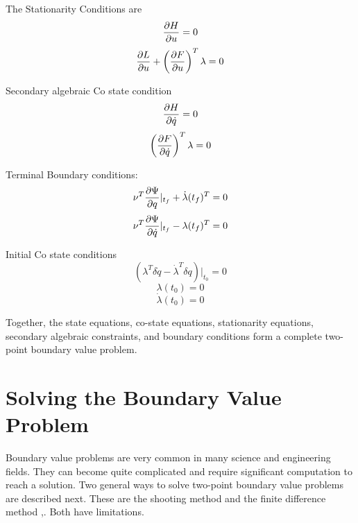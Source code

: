 The Stationarity Conditions are
\begin{equation}
    \frac{\partial H}{\partial u} = 0
\end{equation}
\begin{equation}
    \frac{\partial L}{\partial u} + \left( \frac{\partial F}{\partial u} \right)^T \lambda = 0
\end{equation}

Secondary algebraic Co state condition
\begin{equation}
    \frac{\partial H}{\partial \dot q} = 0
\end{equation}
\begin{equation}
    \left(\frac{\partial F}{\partial \dot q}\right)^T \lambda = 0
\end{equation}

Terminal Boundary conditions:
\begin{equation}
    \nu^T \frac{\partial \Psi}{\partial q}|_{t_f} + \dot \lambda(t_f)^T = 0
\end{equation}
\begin{equation}
    \nu^T \frac{\partial \Psi}{\partial \dot q}|_{t_f} - \lambda(t_f)^T = 0
\end{equation}

Initial Co state conditions
\begin{equation}
    ( \lambda^T \delta \dot q - \dot \lambda^T \delta q )|_{t_0} = 0
\end{equation}
\begin{equation}
    \lambda(t_0) = 0
\end{equation}
\begin{equation}
    \label{initialcostateder}
    \dot \lambda(t_0) = 0
\end{equation}

Together, the state equations, co-state equations, stationarity equations, secondary algebraic constraints, and boundary conditions form a complete two-point boundary value problem.

\section{Solving the Boundary Value Problem}

Boundary value problems are very common in many science and engineering fields. They can become quite complicated and require significant computation to reach a solution. Two general ways to solve two-point boundary value problems are described next. These are the shooting method and the finite difference method \cite{keller1992numerical},\cite{rao2001applied}. Both have limitations.

